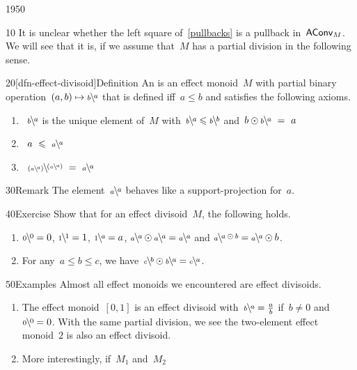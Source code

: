 \begin{parsec}{1950}%
\begin{point}{10}%
It is unclear whether the left square of~\eqref{pullbacks}
    is a pullback in~$\mathsf{AConv}_M$.
We will see that it is, if we assume that~$M$ has
        a partial division in the following sense.
\end{point}
\begin{point}{20}[dfn-effect-divisoid]{Definition}%
An 
    is an effect monoid~$M$
    with partial binary operation~$(a,b) \mapsto \rfrac{a}{b}$
    that is defined iff~$a \leq b$ and
        satisfies the following axioms.
\begin{enumerate}
\item~$\rfrac{a}{b}$
        is the unique element of~$M$
        with~$\rfrac{a}{b} \leq \rfrac{b}{b}$
        and~$b\odot \rfrac{a}{b} \ =\  a$
\item~$a \ \leq \ \rfrac{a}{a}$
\item~$\rfrac{(\rfrac{a}{a})}{(\rfrac{a}{a})} \ =\  \rfrac{a}{a}$
\end{enumerate}
\begin{point}{30}{Remark}%
The element~$\rfrac{a}{a}$ behaves like a support-projection for~$a$.
\end{point}
\end{point}
\begin{point}{40}{Exercise}%
Show that for an effect divisoid~$M$, the following holds.
\begin{enumerate}
\item
    $\rfrac{0}{0}=0$, $\rfrac{1}{1}=1$, $\rfrac{a}{1}=a$, $\rfrac{a}{a} \odot \rfrac{a}{a} = \rfrac{a}{a}$ and
    $\rfrac{a \odot b}{a} = \rfrac{a}{a }\odot b$.
\item
    For any~$a \leq b \leq c$,
    we have~$\rfrac{b}{c} \odot \rfrac{a}{b} = \rfrac{a}{c}$.
\end{enumerate}
\end{point}
\begin{point}{50}{Examples}%
Almost all effect monoids we encountered
    are effect divisoids.
\begin{enumerate}
\item
The effect monoid~$[0,1]$
    is an effect divisoid with~$\rfrac{a}{b} = \frac{a}{b}$
        if~$b \neq 0$ and~$\rfrac{0}{0}=0$.
With the same partial division, we see the two-element effect monoid~$2$
    is also an effect divisoid.
\item
More interestingly,
    if~$M_1$ and~$M_2$

\end{enumerate}
\end{point}
\end{parsec}
